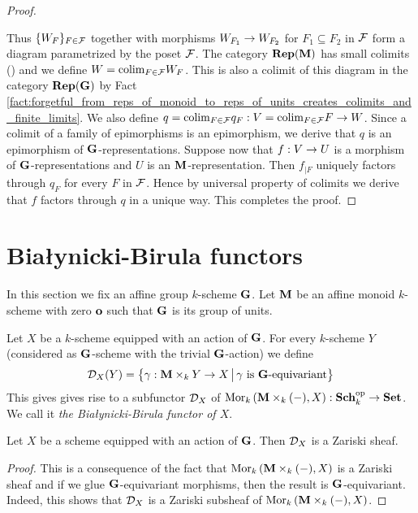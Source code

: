 \begin{proof}
\begin{center}
\end{center}
Thus $\{W_F\}_{F\in {\mathcal F}}$ together with morphisms $W_{F_1}\rightarrow W_{F_2}$ for $F_1\subseteq F_2$ in ${\mathcal F}$ form a diagram parametrized by the poset ${\mathcal F}$. The category $\mathbf{Rep}(\mathbf{M})$ has small colimits ({\cite[Corollary 14.5]{Monoid_k_functors}}) and we define $W = \mathrm{colim}_{F\in {\mathcal F}}W_F$. This is also a colimit of this diagram in the category $\mathbf{Rep}(\mathbf{G})$ by Fact \ref{fact:forgetful_from_reps_of_monoid_to_reps_of_units_creates_colimits_and_finite_limits}. We also define $q = \mathrm{colim}_{F\in {\mathcal F}}q_F:V = \mathrm{colim}_{F\in {\mathcal F}}F \rightarrow W$.  Since a colimit of a family of epimorphisms is an epimorphism, we derive that $q$ is an epimorphism of $\mathbf{G}$-representations. Suppose now that $f:V\rightarrow U$ is a morphism of $\mathbf{G}$-representations and $U$ is an $\mathbf{M}$-representation. Then $f_{\mid F}$ uniquely factors through $q_F$ for every $F$ in ${\mathcal F}$. Hence by universal property of colimits we derive that $f$ factors through $q$ in a unique way. This completes the proof.
\end{proof}

\section{Bia{\l}ynicki-Birula functors}
\noindent
In this section we fix an affine group $k$-scheme $\mathbf{G}$. Let $\mathbf{M}$ be an affine monoid $k$-scheme with zero $\mathbf{o}$ such that $\mathbf{G}$ is its group of units.

\begin{definition}
Let $X$ be a $k$-scheme equipped with an action of $\mathbf{G}$. For every $k$-scheme $Y$ (considered as $\mathbf{G}$-scheme with the trivial $\mathbf{G}$-action) we define
$${\mathcal D}_X(Y) = \big\{\gamma:\mathbf{M}\times_kY\rightarrow X\,\big|\,\gamma\mbox{ is }\mathbf{G}\mbox{-equivariant}\big\}$$
This gives gives rise to a subfunctor ${\mathcal D}_X$ of $\mathrm{Mor}_{k}\left(\mathbf{M}\times_k(-),X\right):\mathbf{Sch}_k^{\mathrm{op}}\rightarrow \mathbf{Set}$. We call it \textit{the Bia{\l}ynicki-Birula functor of $X$}.
\end{definition}

\begin{fact}\label{fact:bb_is_zariski_sheaf}
Let $X$ be a scheme equipped with an action of $\mathbf{G}$. Then ${\mathcal D}_X$ is a Zariski sheaf.
\end{fact}
\begin{proof}
This is a consequence of the fact that $\mathrm{Mor}_{k}\left(\mathbf{M}\times_k(-),X\right)$ is a Zariski sheaf and if we glue $\mathbf{G}$-equivariant morphisms, then the result is $\mathbf{G}$-equivariant. Indeed, this shows that ${\mathcal D}_X$ is a Zariski subsheaf of $\mathrm{Mor}_{k}\left(\mathbf{M}\times_k(-),X\right)$.
\end{proof}

